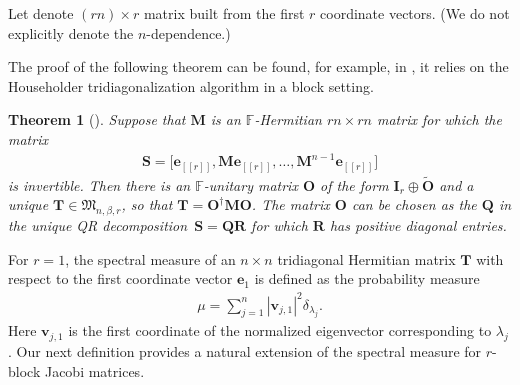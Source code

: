 \documentclass[pdftex]{sigma}
\numberwithin{equation}{section}
\newtheorem{Theorem}{Theorem}[section]
\theoremstyle{definition}
\newcommand{\FF}{{\mathbb{F}}}
\newcommand{\T}{\dag}
\newcommand{\lst}[1]{[\![#1 ]\!]}
\newcommand{\mbf}[1]{\mathbf{#1}}
\begin{document}
Let \smash{$\mbf{e}_{\lst{r}}=[\mbf{I}_r,\mbf{0}_{r\times (n-1)r}]^{\T}$} denote $(rn)\times r$ matrix built from the first $r$ coordinate vectors. (We do not explicitly denote the $n$-dependence.)



The proof of the following theorem can be found, for example, in \cite{Spike2}, it relies on the Householder tridiagonalization algorithm in a block setting.
\begin{Theorem}[\cite{Spike2}]\label{thm:block_basic_1}
 Suppose that $\mbf{M}$ is an $\FF$-Hermitian $rn\times rn$ matrix for which the matrix
 \begin{align}\label{eq:S1234}
 \mbf{S}=\big[\mbf{e}_{\lst{r}}, \mbf{M}\mbf{e}_{\lst{r}},\dots, \mbf{M}^{n-1}\mbf{e}_{\lst{r}}\big]
 \end{align}
 is invertible.
 Then there is an $\FF$-unitary matrix $\mbf{O}$ of the form $\mbf{I}_r\oplus \widetilde{\mbf{O}}$ and a unique $\mbf{T}\in \mathfrak{M}_{n,\beta, r}$, so that $\mbf{T}=\mbf{O}^{\T} \mbf{M} \mbf{O}$. The matrix $\mbf{O}$ can be chosen as the $\mbf{Q}$ in
 the unique QR decomposition~${\mbf{S}=\mbf{Q}\mbf{R}}$ for which $\mbf{R}$ has positive diagonal entries.
\end{Theorem}

For $r=1$, the spectral measure of an $n\times n$ tridiagonal Hermitian matrix $\mbf{T}$ with respect to the first coordinate vector $\mbf{e}_1$ is defined as the probability measure
\begin{align}\label{eq:spec_m}
\mu=\sum_{j=1}^n |\mbf{v}_{j,1}|^2 \delta_{\lambda_j}.
\end{align}
Here $\mbf{v}_{j,1}$ is the first coordinate of the normalized eigenvector corresponding to $\lambda_j$. Our next definition provides a natural extension of the spectral measure for $r$-block Jacobi matrices.
\end{document}
